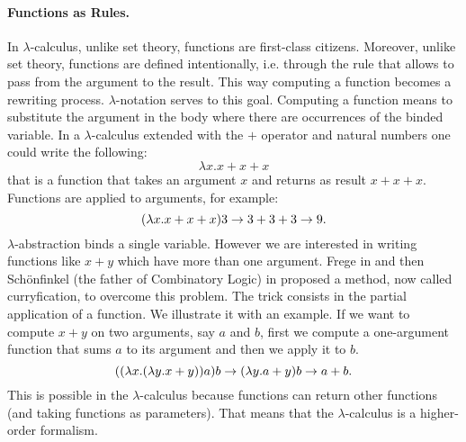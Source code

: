 \paragraph{Functions as Rules.}
In $\lambda$-calculus, unlike set theory, functions are first-class citizens. Moreover, unlike set theory, functions are defined intentionally, i.e. through the rule that allows to pass from the argument to the result. This way computing a function becomes a rewriting process. $\lambda$-notation serves to this goal. Computing a function means to substitute the argument in the body where there are occurrences of the binded variable. In a $\lambda$-calculus extended with the $+$ operator and natural numbers one could write the following:
$$
\lambda x. x+x+x
$$
that is a function that takes an argument $x$ and returns as result $x+x+x$. Functions are applied to arguments, for example:
$$
(\lambda x. x+x+x)3\rightarrow3+3+3\rightarrow 9.
$$
$\lambda$-abstraction binds a single variable. However we are interested in writing functions like $x+y$ which have more than one argument. Frege in \cite{frege_basic_1893} and then Schönfinkel (the father of Combinatory Logic) in \cite{schonfinkel_uber_1924} proposed a method, now called curryfication, to overcome this problem. The trick consists in the partial application of a function.  We illustrate it with an example. If we want to compute $x+y$ on two arguments, say $a$ and $b$, first we compute a one-argument function that sums $a$ to its argument and then we apply it to $b$.
$$
((\lambda x.(\lambda y.x+y))a)b\rightarrow(\lambda y.a+y)b\rightarrow a+b.
$$
This is possible in the $\lambda$-calculus because functions can return other functions (and taking functions as parameters). That means that the $\lambda$-calculus is a higher-order formalism.

